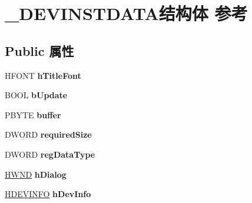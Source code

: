 \hypertarget{struct___d_e_v_i_n_s_t_d_a_t_a}{}\section{\+\_\+\+D\+E\+V\+I\+N\+S\+T\+D\+A\+T\+A结构体 参考}
\label{struct___d_e_v_i_n_s_t_d_a_t_a}
\subsection*{Public 属性}
\begin{DoxyCompactItemize}
\item 
\mbox{\label{struct___d_e_v_i_n_s_t_d_a_t_a_a30feaaa090c9b7b7208d74aa4e20a53c}} 
H\+F\+O\+NT {\bfseries h\+Title\+Font}
\item 
\mbox{\label{struct___d_e_v_i_n_s_t_d_a_t_a_abf3d04dd53e816730ba2c9a759a830c9}} 
B\+O\+OL {\bfseries b\+Update}
\item 
\mbox{\label{struct___d_e_v_i_n_s_t_d_a_t_a_a006a144f2d08c9ef74c60eb3ced0ab07}} 
P\+B\+Y\+TE {\bfseries buffer}
\item 
\mbox{\label{struct___d_e_v_i_n_s_t_d_a_t_a_ae161bbfe4ed0d3ab94445967f1ac592f}} 
D\+W\+O\+RD {\bfseries required\+Size}
\item 
\mbox{\label{struct___d_e_v_i_n_s_t_d_a_t_a_a366342b2124f24942df0cdd396154d9d}} 
D\+W\+O\+RD {\bfseries reg\+Data\+Type}
\item 
\mbox{\label{struct___d_e_v_i_n_s_t_d_a_t_a_a75dd54eda63acab44585f8d5f4f86bf6}} 
\hyperlink{interfacevoid}{H\+W\+ND} {\bfseries h\+Dialog}
\item 
\mbox{\label{struct___d_e_v_i_n_s_t_d_a_t_a_ab06c069afd5a91612833d8e6a705f002}} 
\hyperlink{interfacevoid}{H\+D\+E\+V\+I\+N\+FO} {\bfseries h\+Dev\+Info}
\item 
\mbox{\label{struct___d_e_v_i_n_s_t_d_a_t_a_a687d3461266a8b17dcaffbea43a5db86}} 

\end{DoxyCompactItemize}

